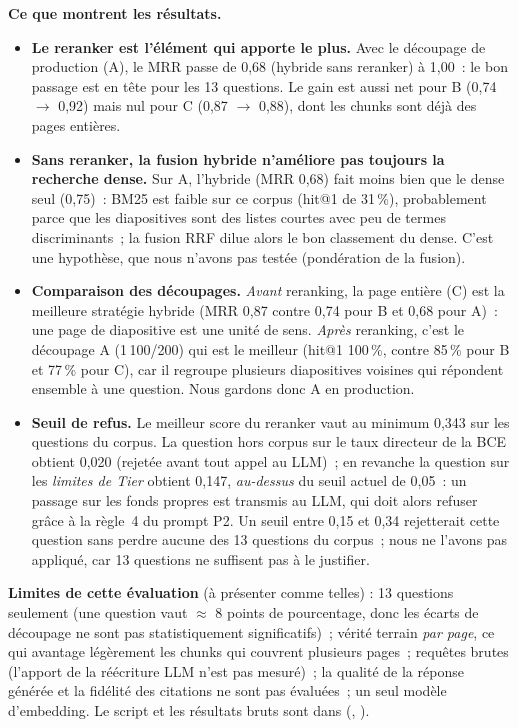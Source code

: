 \textbf{Ce que montrent les r\'esultats.}
\begin{itemize}
\item \textbf{Le reranker est l'\'el\'ement qui apporte le plus.} Avec le d\'ecoupage de production (A), le MRR passe de 0,68 (hybride sans reranker) \`a 1,00~: le bon passage est en t\^ete pour les 13 questions. Le gain est aussi net pour B (0,74 $\to$ 0,92) mais nul pour C (0,87 $\to$ 0,88), dont les chunks sont d\'ej\`a des pages enti\`eres.
\item \textbf{Sans reranker, la fusion hybride n'am\'eliore pas toujours la recherche dense.} Sur A, l'hybride (MRR 0,68) fait moins bien que le dense seul (0,75)~: BM25 est faible sur ce corpus (hit@1 de 31\,\%), probablement parce que les diapositives sont des listes courtes avec peu de termes discriminants~; la fusion RRF dilue alors le bon classement du dense. C'est une hypoth\`ese, que nous n'avons pas test\'ee (pond\'eration de la fusion).
\item \textbf{Comparaison des d\'ecoupages.} \emph{Avant} reranking, la page enti\`ere (C) est la meilleure strat\'egie hybride (MRR 0,87 contre 0,74 pour B et 0,68 pour A)~: une page de diapositive est une unit\'e de sens. \emph{Apr\`es} reranking, c'est le d\'ecoupage A (1\,100/200) qui est le meilleur (hit@1 100\,\%, contre 85\,\% pour B et 77\,\% pour C), car il regroupe plusieurs diapositives voisines qui r\'epondent ensemble \`a une question. Nous gardons donc A en production.
\item \textbf{Seuil de refus.} Le meilleur score du reranker vaut au minimum 0,343 sur les questions du corpus. La question hors corpus sur le taux directeur de la BCE obtient 0,020 (rejet\'ee avant tout appel au LLM)~; en revanche la question sur les \emph{limites de Tier} obtient 0,147, \emph{au-dessus} du seuil actuel de 0,05~: un passage sur les fonds propres est transmis au LLM, qui doit alors refuser gr\^ace \`a la r\`egle~4 du prompt P2. Un seuil entre 0,15 et 0,34 rejetterait cette question sans perdre aucune des 13 questions du corpus~; nous ne l'avons pas appliqu\'e, car 13 questions ne suffisent pas \`a le justifier.
\end{itemize}
\textbf{Limites de cette \'evaluation} (\`a pr\'esenter comme telles) : 13 questions seulement (une question vaut $\approx$ 8 points de pourcentage, donc les \'ecarts de d\'ecoupage ne sont pas statistiquement significatifs)~; v\'erit\'e terrain \emph{par page}, ce qui avantage l\'eg\`erement les chunks qui couvrent plusieurs pages~; requ\^etes brutes (l'apport de la r\'e\'ecriture LLM n'est pas mesur\'e)~; la qualit\'e de la r\'eponse g\'en\'er\'ee et la fid\'elit\'e des citations ne sont pas \'evalu\'ees~; un seul mod\`ele d'embedding. Le script et les r\'esultats bruts sont dans  (, ).
